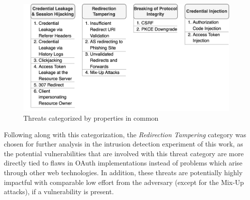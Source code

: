 \begin{figure}[H]
	\sffamily\footnotesize
	\includegraphics[width=1\textwidth]{pic/threat_taxonomy.png}
	\unitlength=0.75mm
	\linethickness{0.4pt}
	\caption{Threats categorized by properties in common}
	\label{fig:threat_taxonomy}
\end{figure}

Following along with this categorization, the \emph{Redirection Tampering} category was chosen for further analysis in the intrusion detection experiment of this work, as the potential vulnerabilities that are involved with this threat category are more directly tied to flaws in OAuth implementations instead of problems which arise through other web technologies. In addition, these threats are potentially highly impactful with comparable low effort from the adversary (except for the Mix-Up attacks), if a vulnerability is present.